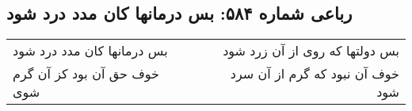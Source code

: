 \begin{center}
\section*{رباعی شماره ۵۸۴: بس درمانها کان مدد درد شود}
\label{sec:0584}
\begin{longtable}{l p{0.5cm} r}
بس درمانها کان مدد درد شود
&&
بس دولتها که روی از آن زرد شود
\\
خوف حق آن بود کز آن گرم شوی
&&
خوف آن نبود که گرم از آن سرد شود
\\
\end{longtable}
\end{center}
